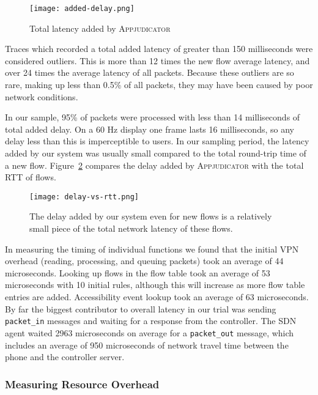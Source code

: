 \begin{figure}[h]
    \centering
	\texttt{[image: added-delay.png]}
	\caption{Total latency added by \textsc{Appjudicator}}
	\label{fig:added-delay-chart}
\end{figure}

Traces which recorded a total added latency of greater than 150 milliseconds
were considered outliers. This is more than 12 times the new flow average
latency, and over 24 times the average latency of all packets. Because these
outliers are so rare, making up less than 0.5\% of all packets, they may have
been caused by poor network conditions.

In our sample, 95\% of packets were processed with less than 14 milliseconds
of total added delay. On a 60 Hz display one frame lasts 16 milliseconds, so any
delay less than this is imperceptible to users. In our sampling period, the
latency added by our system was usually small compared to the total round-trip
time of a new flow. Figure~\ref{fig:delay-vs-rtt} compares the delay added by
\textsc{Appjudicator} with the total RTT of flows.

\begin{figure}[h]
    \centering
	\texttt{[image: delay-vs-rtt.png]}
	\caption{The delay added by our system even for new flows is a relatively
		small piece of the total network latency of these flows.}
	\label{fig:delay-vs-rtt}
\end{figure}

In measuring the timing of individual functions we found that the initial VPN
overhead (reading, processing, and queuing packets) took an average of 44
microseconds. Looking up flows in the flow table took an average of 53
microseconds with 10 initial rules, although this will increase as more flow
table entries are added. Accessibility event lookup took an average of 63
microseconds. By far the biggest contributor to overall latency in our trial was
sending \texttt{packet\_in} messages and waiting for a response from the
controller. The SDN agent waited 2963 microseconds on average for a
\texttt{packet\_out} message, which includes an average of 950 microseconds of
network travel time between the phone and the controller server.

\subsubsection{Measuring Resource Overhead}
\label{sec:measuring-resource-overhead}


